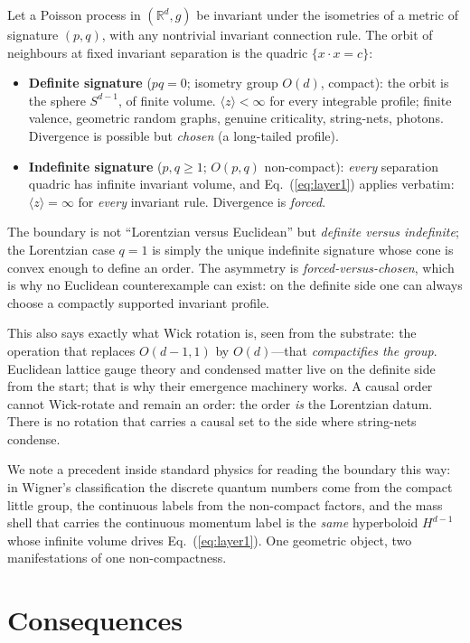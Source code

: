 \documentclass[aps,prd,reprint,nofootinbib,superscriptaddress,floatfix]{revtex4-2}
\begin{document}
Let a Poisson process in $(\mathbb{R}^d, g)$ be invariant under the isometries of a
metric of signature $(p,q)$, with any nontrivial invariant connection rule. The orbit of
neighbours at fixed invariant separation is the quadric $\{x\cdot x=c\}$:

\begin{itemize}
\item \textbf{Definite signature} ($pq=0$; isometry group $O(d)$, compact): the orbit is
the sphere $S^{d-1}$, of finite volume. $\langle z\rangle<\infty$ for every integrable
profile; finite valence, geometric random graphs, genuine criticality, string-nets,
photons. Divergence is possible but \emph{chosen} (a long-tailed profile).
\item \textbf{Indefinite signature} ($p,q\geq 1$; $O(p,q)$ non-compact): \emph{every}
separation quadric has infinite invariant volume, and Eq.~(\ref{eq:layer1}) applies
verbatim: $\langle z\rangle=\infty$ for \emph{every} invariant rule. Divergence is
\emph{forced}.
\end{itemize}

The boundary is not ``Lorentzian versus Euclidean'' but \emph{definite versus
indefinite}; the Lorentzian case $q=1$ is simply the unique indefinite signature whose
cone is convex enough to define an order. The asymmetry is
\emph{forced-versus-chosen}, which is why no Euclidean counterexample can exist: on the
definite side one can always choose a compactly supported invariant profile.

This also says exactly what Wick rotation is, seen from the substrate: the operation
that replaces $O(d-1,1)$ by $O(d)$---that \emph{compactifies the group}. Euclidean
lattice gauge theory and condensed matter live on the definite side from the start;
that is why their emergence machinery works. A causal order cannot Wick-rotate and
remain an order: the order \emph{is} the Lorentzian datum. There is no rotation that
carries a causal set to the side where string-nets condense.

We note a precedent inside standard physics for reading the boundary this way: in
Wigner's classification the discrete quantum numbers come from the compact little group,
the continuous labels from the non-compact factors, and the mass shell that carries the
continuous momentum label is the \emph{same} hyperboloid $H^{d-1}$ whose infinite volume
drives Eq.~(\ref{eq:layer1}). One geometric object, two manifestations of one
non-compactness.

\section{Consequences}
\end{document}
